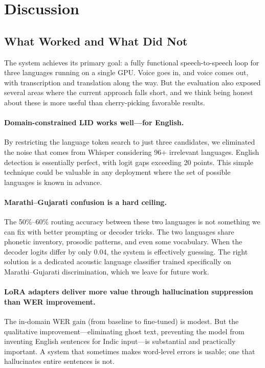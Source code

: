 
\section{Discussion}
\label{sec:discussion}

\subsection{What Worked and What Did Not}

The system achieves its primary goal: a fully functional speech-to-speech loop for three languages running on a single GPU. Voice goes in, and voice comes out, with transcription and translation along the way. But the evaluation also exposed several areas where the current approach falls short, and we think being honest about these is more useful than cherry-picking favorable results.

\paragraph{Domain-constrained LID works well---for English.} By restricting the language token search to just three candidates, we eliminated the noise that comes from Whisper considering 96+ irrelevant languages. English detection is essentially perfect, with logit gaps exceeding 20 points. This simple technique could be valuable in any deployment where the set of possible languages is known in advance.

\paragraph{Marathi--Gujarati confusion is a hard ceiling.} The 50\%--60\% routing accuracy between these two languages is not something we can fix with better prompting or decoder tricks. The two languages share phonetic inventory, prosodic patterns, and even some vocabulary. When the decoder logits differ by only 0.04, the system is effectively guessing. The right solution is a dedicated acoustic language classifier trained specifically on Marathi--Gujarati discrimination, which we leave for future work.

\paragraph{LoRA adapters deliver more value through hallucination suppression than WER improvement.} The in-domain WER gain (from baseline to fine-tuned) is modest. But the qualitative improvement---eliminating ghost text, preventing the model from inventing English sentences for Indic input---is substantial and practically important. A system that sometimes makes word-level errors is usable; one that hallucinates entire sentences is not.

